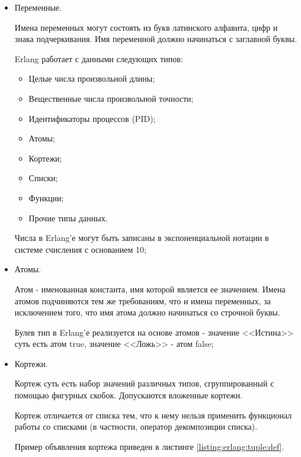 \begin{itemize}

	\item Переменные.

		Имена переменных могут состоять из букв латинского алфавита, цифр и знака подчеркивания. Имя переменной должно начинаться с заглавной буквы.

		Erlang работает с данными следующих типов:

		\begin{itemize}

			\item Целые числа произвольной длины;
			\item Вещественные числа произвольной точности;
			\item Идентификаторы процессов (PID);
			\item Атомы;
			\item Кортежи;
			\item Списки;
			\item Функции;
			\item Прочие типы данных.

		\end{itemize}

		Числа в Erlang'е могут быть записаны в экспоненциальной нотации в системе счисления с основанием 10;

	\item Атомы.

		Атом - именованная константа, имя которой является ее значением. Имена атомов подчиняются тем же требованиям, что и имена переменных, за исключением того, что имя атома должно начинаться со строчной буквы.

		Булев тип в Erlang'е реализуется на основе атомов - значение <<Истина>> суть есть атом true, значение <<Ложь>> - атом false;

	\item Кортежи.

		Кортеж суть есть набор значений различных типов, сгруппированный с помощью фигурных скобок. Допускаются вложенные кортежи.

		Кортеж отличается от списка тем, что к нему нельзя применить функционал работы со списками (в частности, оператор декомпозиции списка).

		Пример объявления кортежа приведен в листинге \ref{listing:erlang:tuple:def}.
		
\begin{lstlisting}


\end{lstlisting}
\end{itemize}
